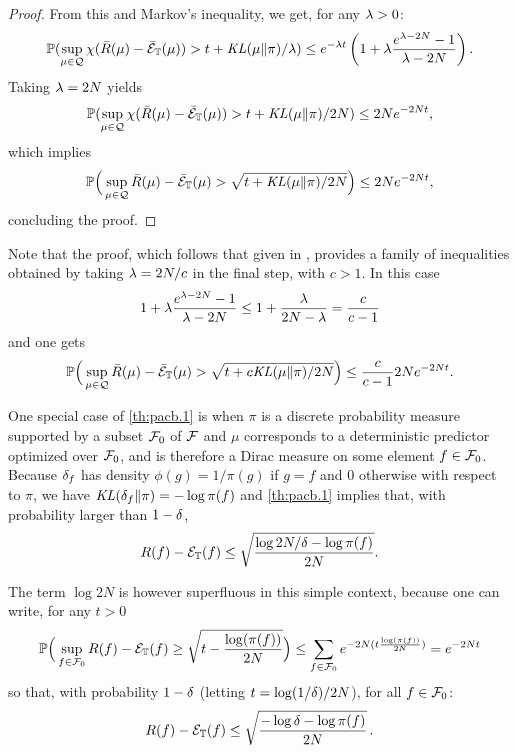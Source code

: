 \begin{proof}
From this and Markov's inequality, we get, for any $\lambda >0$: 
\[
\bm{\mathbb P}(\sup_{\mu\in{\mathcal Q}} \chi(\bar R(\mu) - \bar{{\mathcal E}}_{{\mathbb T}}(\mu)) > t + \mathit{KL}(\mu\|\pi)/\lambda ) \leq e^{- \lambda t} \left(1 +\lambda \frac{e^{\lambda - 2N}-1}{\lambda - 2N}\right).
\]
Taking $\lambda = 2N$ yields
\[
\bm{\mathbb P}(\sup_{\mu\in{\mathcal Q}} \chi(\bar R(\mu) - \bar{{\mathcal E}}_{{\mathbb T}}(\mu)) > t + \mathit{KL}(\mu\|\pi)/2N ) \leq 2Ne^{- 2Nt}, 
\]
which implies
\[
\bm{\mathbb P}\Big(\sup_{\mu\in{\mathcal Q}} \bar R(\mu) - \bar{{\mathcal E}}_{{\mathbb T}}(\mu) > \sqrt{t + \mathit{KL}(\mu\|\pi)/2N} \Big) \leq 2Ne^{- 2Nt}, 
\]
concluding the proof.
%
\end{proof}
\begin{remark}
\label{rem:conc.multiple.bayesian}
Note that the proof, which follows that given in \citet{audibert2007combining}, provides a family of inequalities obtained by taking $\lambda = 2N/c$ in the final step, with $c>1$. In this case
\[
1 +\lambda \frac{e^{\lambda - 2N}-1}{\lambda - 2N} \leq 1 + \frac{\lambda}{2N-\lambda} = \frac{c}{c-1}
\]
and one gets
\[
\bm{\mathbb P}\Big(\sup_{\mu\in{\mathcal Q}} \bar R(\mu) - \bar{{\mathcal E}}_{{\mathbb T}}(\mu) > \sqrt{t + c \mathit{KL}(\mu\|\pi)/2N} \Big) \leq \frac{c}{c-1} 2Ne^{- 2Nt}.
\]
\end{remark}


\begin{remark}
\label{rem:conbayesian}
One special case of  \cref{th:pacb.1} is when $\pi$ is a discrete probability measure supported by a subset ${\mathcal F}_0$ of ${\mathcal F}$ and $\mu$ corresponds to a deterministic predictor optimized over ${\mathcal F}_0$, and is therefore a Dirac measure on some element $f\in {\mathcal F}_0$. Because $\delta_f$ has density $\phi(g) = 1/\pi(g)$ if $g=f$ and 0 otherwise  with respect to $\pi$, we have 
$\mathit{KL}(\delta_f\|\pi) = - \log \pi(f)$ and  \cref{th:pacb.1} implies that, with probability larger than $1-\delta$,
\[
R(f) - {\mathcal E}_{{\mathbb T}}(f) \leq \sqrt{\frac{\log{2N/\delta} - \log\pi(f)}{2N}}.
\]

The term $\log2N$ is however superfluous in this simple context, because one can write, for any $t>0$
\[
\bm{\mathbb P}\Big(\sup_{f\in{\mathcal F}_0} R(f) - {\mathcal E}_{\mathbb T}(f) \geq \sqrt{t- \frac{\log(\pi(f))}{2N}}\Big) \leq 
\sum_{f\in{\mathcal F}_0} e^{-2N(t\frac{\log(\pi(f))}{2N})}
= e^{-2Nt}
\]
so that, with probability $1-\delta$ (letting $t = \log(1/\delta)/2N$), for all $f\in {\mathcal F}_0$:
\[
R(f) - {\mathcal E}_{\mathbb T}(f) \leq \sqrt{\frac{- \log{\delta} - \log\pi(f)}{2N}}\,.
\]
\end{remark}


